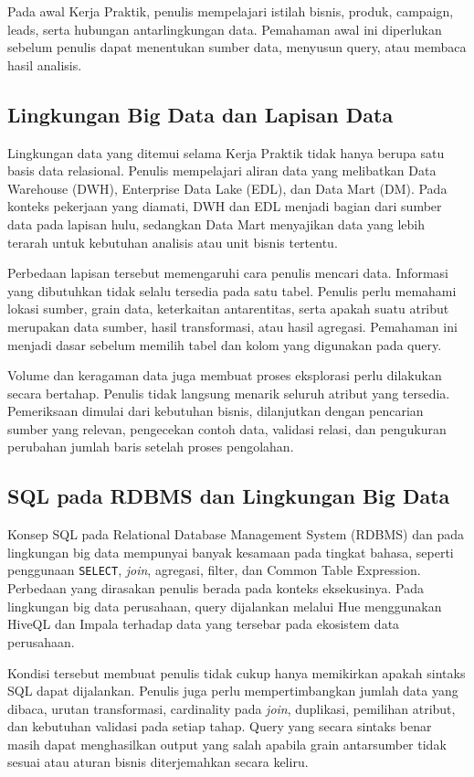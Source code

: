 Pada awal Kerja Praktik, penulis mempelajari istilah bisnis, produk, campaign, leads, serta hubungan antarlingkungan data. Pemahaman awal ini diperlukan sebelum penulis dapat menentukan sumber data, menyusun query, atau membaca hasil analisis.

\subsection{Lingkungan Big Data dan Lapisan Data}

Lingkungan data yang ditemui selama Kerja Praktik tidak hanya berupa satu basis data relasional. Penulis mempelajari aliran data yang melibatkan Data Warehouse (DWH), Enterprise Data Lake (EDL), dan Data Mart (DM). Pada konteks pekerjaan yang diamati, DWH dan EDL menjadi bagian dari sumber data pada lapisan hulu, sedangkan Data Mart menyajikan data yang lebih terarah untuk kebutuhan analisis atau unit bisnis tertentu.

Perbedaan lapisan tersebut memengaruhi cara penulis mencari data. Informasi yang dibutuhkan tidak selalu tersedia pada satu tabel. Penulis perlu memahami lokasi sumber, grain data, keterkaitan antarentitas, serta apakah suatu atribut merupakan data sumber, hasil transformasi, atau hasil agregasi. Pemahaman ini menjadi dasar sebelum memilih tabel dan kolom yang digunakan pada query.

Volume dan keragaman data juga membuat proses eksplorasi perlu dilakukan secara bertahap. Penulis tidak langsung menarik seluruh atribut yang tersedia. Pemeriksaan dimulai dari kebutuhan bisnis, dilanjutkan dengan pencarian sumber yang relevan, pengecekan contoh data, validasi relasi, dan pengukuran perubahan jumlah baris setelah proses pengolahan.

\subsection{SQL pada RDBMS dan Lingkungan Big Data}

Konsep SQL pada Relational Database Management System (RDBMS) dan pada lingkungan big data mempunyai banyak kesamaan pada tingkat bahasa, seperti penggunaan \texttt{SELECT}, \textit{join}, agregasi, filter, dan Common Table Expression. Perbedaan yang dirasakan penulis berada pada konteks eksekusinya. Pada lingkungan big data perusahaan, query dijalankan melalui Hue menggunakan HiveQL dan Impala terhadap data yang tersebar pada ekosistem data perusahaan.

Kondisi tersebut membuat penulis tidak cukup hanya memikirkan apakah sintaks SQL dapat dijalankan. Penulis juga perlu mempertimbangkan jumlah data yang dibaca, urutan transformasi, cardinality pada \textit{join}, duplikasi, pemilihan atribut, dan kebutuhan validasi pada setiap tahap. Query yang secara sintaks benar masih dapat menghasilkan output yang salah apabila grain antarsumber tidak sesuai atau aturan bisnis diterjemahkan secara keliru.

